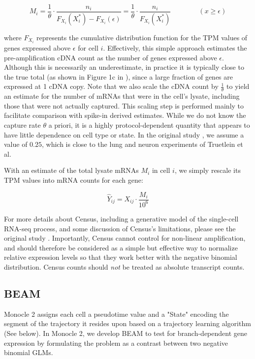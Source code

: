 \documentclass[10pt,oneside]{article}\usepackage[]{graphicx}\usepackage[]{color}
\begin{document}
\begin{equation}
M_i = \frac{1}{\theta} \cdot \frac{n_i}{F_{X_i}(X_i^*) - F_{X_i}(\epsilon)}  
= \frac{1}{\theta} \cdot \frac{n_i}{F_{X_i}(X_i^*)}\quad\quad\quad\quad (x \geq \epsilon)
\end{equation}

where $F_{X_i}$ represents the cumulative distribution function for the TPM values of genes expressed above $\epsilon$ for cell $i$. Effectively, this simple approach estimates the pre-amplification cDNA count as the number of genes expressed above $\epsilon$. Although this is necessarily an underestimate, in practice it is typically close to the true total (as shown in Figure 1c in \cite{qiu2017single}), since a large fraction of genes are expressed at 1 cDNA copy. Note that we also scale the cDNA count by $\frac{1}{\theta}$ to yield an estimate for the number of mRNAs that were in the cell's lysate, including those that were not actually captured. This scaling step is performed mainly to facilitate comparison with spike-in derived estimates. While we do not know the capture rate $\theta$ a priori, it is a highly protocol-dependent quantity that appears to have little dependence on cell type or state. In the original study \cite{qiu2017single}, we assume a value of $0.25$, which is close to the lung and neuron experiments of Truetlein et al. 

With an estimate of the total lysate mRNAs $M_i$ in cell $i$, we simply rescale its TPM values into mRNA counts for each gene:

\begin{equation}
\hat{Y}_{ij} = X_{ij} \cdot \frac{M_i} {10^6}
\end{equation}

For more details about Census, including a generative model of the single-cell RNA-seq process, and some discussion of Census's limitations, please see the original study \cite{qiu2017single}. Importantly, Census cannot control for non-linear amplification, and should therefore be considered as a simple but effective way to normalize relative expression levels so that they work better with the negative binomial distribution. Census counts should \emph{not} be treated as absolute transcript counts.

\subsection{BEAM}\label{BEAM}
Monocle 2 assigns each cell a pseudotime value and a "State" encoding the segment of the trajectory it resides upon based on a trajectory learning algorithm (See below). 
In Monocle 2, we develop BEAM to test for branch-dependent gene expression by formulating the problem as a contrast between two negative binomial GLMs. 
\end{document}
